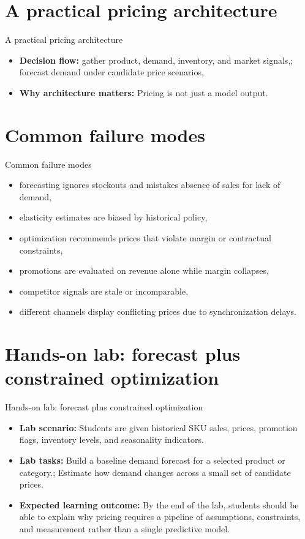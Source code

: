 \documentclass[aspectratio=169]{beamer}
\begin{document}
\section{A practical pricing architecture}

\begin{frame}{A practical pricing architecture}
  \begin{itemize}
    \item \textbf{Decision flow:} gather product, demand, inventory, and market signals,; forecast demand under candidate price scenarios,
    \item \textbf{Why architecture matters:} Pricing is not just a model output.
  \end{itemize}
\end{frame}

\section{Common failure modes}

\begin{frame}{Common failure modes}
  \begin{itemize}
    \item forecasting ignores stockouts and mistakes absence of sales for lack of demand,
    \item elasticity estimates are biased by historical policy,
    \item optimization recommends prices that violate margin or contractual constraints,
    \item promotions are evaluated on revenue alone while margin collapses,
    \item competitor signals are stale or incomparable,
    \item different channels display conflicting prices due to synchronization delays.
  \end{itemize}
\end{frame}

\section{Hands-on lab: forecast plus constrained optimization}

\begin{frame}{Hands-on lab: forecast plus constrained optimization}
  \begin{itemize}
    \item \textbf{Lab scenario:} Students are given historical SKU sales, prices, promotion flags, inventory levels, and seasonality indicators.
    \item \textbf{Lab tasks:} Build a baseline demand forecast for a selected product or category.; Estimate how demand changes across a small set of candidate prices.
    \item \textbf{Expected learning outcome:} By the end of the lab, students should be able to explain why pricing requires a pipeline of assumptions, constraints, and measurement rather than a single predictive model.
  \end{itemize}
\end{frame}
\end{document}
